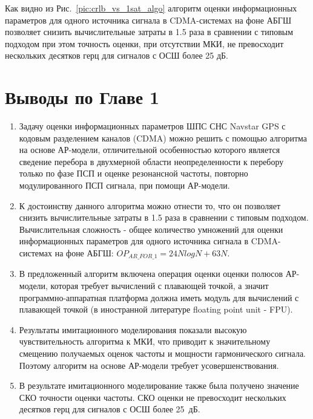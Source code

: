 Как видно из \mbox{Рис. \ref{pic:crlb_vs_1sat_algo}} алгоритм оценки информационных параметров для одного источника сигнала в CDMA-системах на фоне АБГШ позволяет снизить вычислительные
затраты в 1.5 раза в сравнении с типовым подходом при этом точность оценки, при отсутствии МКИ, не превосходит нескольких десятков герц для сигналов
с ОСШ более 25 дБ.


\section{Выводы по Главе 1}

\begin{enumerate}
\item Задачу оценки информационных параметров ШПС СНС Navstar GPS с кодовым разделением каналов (CDMA) можно решить с помощью алгоритма на основе АР-модели,
	отличительной особенностью которого является сведение перебора в двухмерной области неопределенности к перебору только по фазе ПСП и оценке
	резонансной частоты, повторно модулированного ПСП сигнала, при помощи АР-модели.

\item К достоинству данного алгоритма можно отнести то, что он позволяет снизить вычислительные затраты в 1.5 раза в сравнении с типовым подходом.
	Вычислительная сложность - общее количество умножений для оценки информационных параметров для одного источника сигнала в CDMA-системах на фоне АБГШ:
	${OP_{AR\_FOR\_1} = 24NlogN + 63N}$.


\item В предложенный алгоритм включена операция оценки оценки полюсов АР-модели, которая требует вычислений с плавающей точкой, а значит программно-аппаратная
	платформа должна иметь модуль для вычислений с плавающей точкой (в иностранной литературе floating point unit - FPU).

\item Результаты имитационного моделирования показали высокую чувствительность алгоритма к МКИ, что приводит к значительному смещению получаемых оценок
	частоты и мощности гармонического сигнала. Поэтому алгоритм на основе АР-модели требует усовершенствования.

\item В результате имитационного моделирование также была получено значение СКО точности оценки частоты. СКО оценки не превосходит нескольких десятков герц для сигналов
	с ОСШ более \mbox{25 дБ}.


\end{enumerate}
